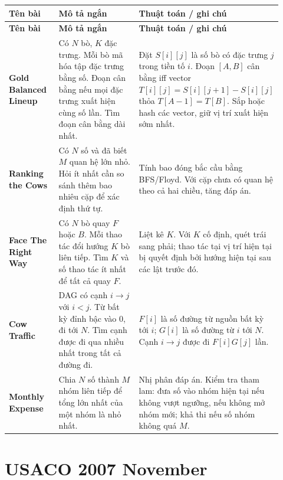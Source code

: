 \documentclass[11pt]{article}
\newenvironment{solutiontable}{%
  \small
  \setlength{\tabcolsep}{4pt}
  \renewcommand{\arraystretch}{1.14}
  \begin{longtable}{L{0.19\linewidth}L{0.39\linewidth}L{0.34\linewidth}}
  \toprule
  \textbf{Tên bài} & \textbf{Mô tả ngắn} & \textbf{Thuật toán / ghi chú}\\
  \midrule
  \endfirsthead
  \toprule
  \textbf{Tên bài} & \textbf{Mô tả ngắn} & \textbf{Thuật toán / ghi chú}\\
  \midrule
  \endhead
}{%
  \bottomrule
  \end{longtable}
  \normalsize
}
\newcommand{\problemrow}[3]{\textbf{#1} & #2 & #3\\\midrule}
\begin{document}
\begin{solutiontable}
\problemrow{Gold Balanced Lineup}{Có \(N\) bò, \(K\) đặc trưng. Mỗi bò mã hóa tập đặc trưng bằng số. Đoạn cân bằng nếu mọi đặc trưng xuất hiện cùng số lần. Tìm đoạn cân bằng dài nhất.}{Đặt \(S[i][j]\) là số bò có đặc trưng \(j\) trong tiền tố \(i\). Đoạn \([A,B]\) cân bằng iff vector \(T[i][j]=S[i][j+1]-S[i][j]\) thỏa \(T[A-1]=T[B]\). Sắp hoặc hash các vector, giữ vị trí xuất hiện sớm nhất.}
\problemrow{Ranking the Cows}{Có \(N\) số và đã biết \(M\) quan hệ lớn nhỏ. Hỏi ít nhất cần so sánh thêm bao nhiêu cặp để xác định thứ tự.}{Tính bao đóng bắc cầu bằng BFS/Floyd. Với cặp chưa có quan hệ theo cả hai chiều, tăng đáp án.}
\problemrow{Face The Right Way}{Có \(N\) bò quay \(F\) hoặc \(B\). Mỗi thao tác đổi hướng \(K\) bò liên tiếp. Tìm \(K\) và số thao tác ít nhất để tất cả quay \(F\).}{Liệt kê \(K\). Với \(K\) cố định, quét trái sang phải; thao tác tại vị trí hiện tại bị quyết định bởi hướng hiện tại sau các lật trước đó.}
\problemrow{Cow Traffic}{DAG có cạnh \(i\to j\) với \(i<j\). Từ bất kỳ đỉnh bậc vào \(0\), đi tới \(N\). Tìm cạnh được đi qua nhiều nhất trong tất cả đường đi.}{\(F[i]\) là số đường từ nguồn bất kỳ tới \(i\); \(G[i]\) là số đường từ \(i\) tới \(N\). Cạnh \(i\to j\) được đi \(F[i]G[j]\) lần.}
\problemrow{Monthly Expense}{Chia \(N\) số thành \(M\) nhóm liên tiếp để tổng lớn nhất của một nhóm là nhỏ nhất.}{Nhị phân đáp án. Kiểm tra tham lam: đưa số vào nhóm hiện tại nếu không vượt ngưỡng, nếu không mở nhóm mới; khả thi nếu số nhóm không quá \(M\).}
\end{solutiontable}

\section{USACO 2007 November}
\end{document}
